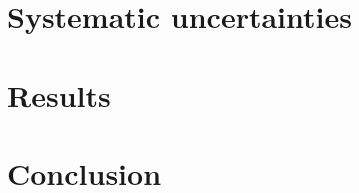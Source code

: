 \documentclass[NOTE, english, texlive=2017]{\ATLASLATEXPATH atlasdoc}
\begin{document}
\section{Systematic uncertainties}
\label{sec:syst}


\section{Results}
\label{sec:result}



\FloatBarrier
\section{Conclusion}
\label{sec:conclusion}


\newpage
\printbibliography
%
%

\clearpage


\clearpage
\appendix
\end{document}
